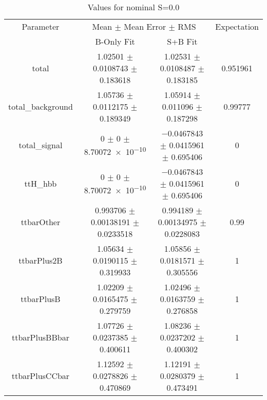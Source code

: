 \begin{table}
\centering
\caption{Values for nominal S=0.0}
\begin{tabular}{cccc}
\toprule
Parameter & \multicolumn{2}{c}{Mean $\pm$ Mean Error $\pm$ RMS} & Expectation\\
 & B-Only Fit & S+B Fit & \\
\midrule
total & \num{1.02501} $\pm$ \num{0.0108743} $\pm$ \num{0.183618} & \num{1.02531} $\pm$ \num{0.0108487} $\pm$ \num{0.183185} & \num{0.951961}\\
total\_background & \num{1.05736} $\pm$ \num{0.0112175} $\pm$ \num{0.189349} & \num{1.05914} $\pm$ \num{0.011096} $\pm$ \num{0.187298} & \num{0.99777}\\
total\_signal & \num{0} $\pm$ \num{0} $\pm$ \num{8.70072e-10} & \num{-0.0467843} $\pm$ \num{0.0415961} $\pm$ \num{0.695406} & \num{0}\\
ttH\_hbb & \num{0} $\pm$ \num{0} $\pm$ \num{8.70072e-10} & \num{-0.0467843} $\pm$ \num{0.0415961} $\pm$ \num{0.695406} & \num{0}\\
ttbarOther & \num{0.993706} $\pm$ \num{0.00138191} $\pm$ \num{0.0233518} & \num{0.994189} $\pm$ \num{0.00134975} $\pm$ \num{0.0228083} & \num{0.99}\\
ttbarPlus2B & \num{1.05634} $\pm$ \num{0.0190115} $\pm$ \num{0.319933} & \num{1.05856} $\pm$ \num{0.0181571} $\pm$ \num{0.305556} & \num{1}\\
ttbarPlusB & \num{1.02209} $\pm$ \num{0.0165475} $\pm$ \num{0.279759} & \num{1.02496} $\pm$ \num{0.0163759} $\pm$ \num{0.276858} & \num{1}\\
ttbarPlusBBbar & \num{1.07726} $\pm$ \num{0.0237385} $\pm$ \num{0.400611} & \num{1.08236} $\pm$ \num{0.0237202} $\pm$ \num{0.400302} & \num{1}\\
ttbarPlusCCbar & \num{1.12592} $\pm$ \num{0.0278826} $\pm$ \num{0.470869} & \num{1.12191} $\pm$ \num{0.0280379} $\pm$ \num{0.473491} & \num{1}\\
\bottomrule
\end{tabular}
\end{table}